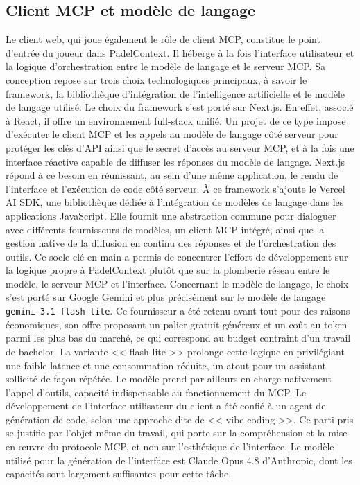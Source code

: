 \documentclass[12pt]{article}
\begin{document}
\subsection{Client MCP et modèle de langage}
Le client web, qui joue également le rôle de client MCP, constitue le point d'entrée du joueur dans PadelContext. Il héberge à la fois l'interface utilisateur et la logique d'orchestration entre le modèle de langage et le serveur MCP. Sa conception repose sur trois choix technologiques principaux, à savoir le framework, la bibliothèque d'intégration de l'intelligence artificielle et le modèle de langage utilisé.
\newline\newline
Le choix du framework s'est porté sur Next.js. En effet, associé à React, il offre un environnement full-stack unifié. Un projet de ce type impose d'exécuter le client MCP et les appels au modèle de langage côté serveur pour protéger les clés d'API ainsi que le secret d'accès au serveur MCP, et à la fois une interface réactive capable de diffuser les réponses du modèle de langage. Next.js répond à ce besoin en réunissant, au sein d'une même application, le rendu de l'interface et l'exécution de code côté serveur.
\newline\newline
À ce framework s'ajoute le Vercel AI SDK, une bibliothèque dédiée à l'intégration de modèles de langage dans les applications JavaScript. Elle fournit une abstraction commune pour dialoguer avec différents fournisseurs de modèles, un client MCP intégré, ainsi que la gestion native de la diffusion en continu des réponses et de l'orchestration des outils. Ce socle clé en main a permis de concentrer l'effort de développement sur la logique propre à PadelContext plutôt que sur la plomberie réseau entre le modèle, le serveur MCP et l'interface.
\newline\newline
Concernant le modèle de langage, le choix s'est porté sur Google Gemini et plus précisément sur le modèle de langage \texttt{gemini-3.1-flash-lite}. Ce fournisseur a été retenu avant tout pour des raisons économiques, son offre proposant un palier gratuit généreux et un coût au token parmi les plus bas du marché, ce qui correspond au budget contraint d'un travail de bachelor. La variante << flash-lite >> prolonge cette logique en privilégiant une faible latence et une consommation réduite, un atout pour un assistant sollicité de façon répétée. Le modèle prend par ailleurs en charge nativement l'appel d'outils, capacité indispensable au fonctionnement du MCP.
\newline\newline
Le développement de l'interface utilisateur du client a été confié à un agent de génération de code, selon une approche dite de << vibe coding >>. Ce parti pris se justifie par l'objet même du travail, qui porte sur la compréhension et la mise en œuvre du protocole MCP, et non sur l'esthétique de l'interface. Le modèle utilisé pour la génération de l'interface est Claude Opus 4.8 d'Anthropic, dont les capacités sont largement suffisantes pour cette tâche.
\end{document}
